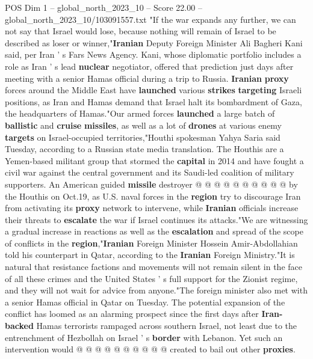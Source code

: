 \begin{textsample}{POS Dim 1 – global\_north\_2023\_10 – Score 22.00 – global\_north\_2023\_10/103091557.txt}  \label{ex:f1_pos_142}
"If the war expands any further, we can not say that Israel would lose, because nothing will remain of Israel to be described as loser or winner,"\textbf{Iranian} Deputy Foreign Minister Ali Bagheri Kani said, per Iran ' s Fars News Agency.
Kani, whose diplomatic portfolio includes a role as Iran ' s lead \textbf{nuclear} negotiator, offered that prediction just days after meeting with a senior Hamas official during a trip to Russia. \textbf{Iranian} \textbf{proxy} forces around the Middle East have \textbf{launched} various \textbf{strikes} \textbf{targeting} Israeli positions, as Iran and Hamas demand that Israel halt its bombardment of Gaza, the headquarters of Hamas."Our armed forces \textbf{launched} a large batch of \textbf{ballistic} and \textbf{cruise} \textbf{missiles}, as well as a lot of \textbf{drones} at various enemy \textbf{targets} on Israel-occupied territories,"Houthi spokesman Yahya Saria said Tuesday, according to a Russian state media translation.
The Houthis are a Yemen-based militant group that stormed the \textbf{capital} in 2014 and have fought a civil war against the central government and its Saudi-led coalition of military supporters.
An American guided \textbf{missile} destroyer @ @ @ @ @ @ @ @ @ @ by the Houthis on Oct.19, as U.S. naval forces in the \textbf{region} try to discourage Iran from activating its \textbf{proxy} network to intervene, while \textbf{Iranian} officials increase their threats to \textbf{escalate} the war if Israel continues its attacks."We are witnessing a gradual increase in reactions as well as the \textbf{escalation} and spread of the scope of conflicts in the \textbf{region},"\textbf{Iranian} Foreign Minister Hossein Amir-Abdollahian told his counterpart in Qatar, according to the \textbf{Iranian} Foreign Ministry."It is natural that resistance factions and movements will not remain silent in the face of all these crimes and the United States ' s full support for the Zionist regime, and they will not wait for advice from anyone."The foreign minister also met with a senior Hamas official in Qatar on Tuesday.
The potential expansion of the conflict has loomed as an alarming prospect since the first days after \textbf{Iran-backed} Hamas terrorists rampaged across southern Israel, not least due to the entrenchment of Hezbollah on Israel ' s \textbf{border} with Lebanon.
Yet such an intervention would @ @ @ @ @ @ @ @ @ @ created to bail out other \textbf{proxies}.

\end{textsample}
